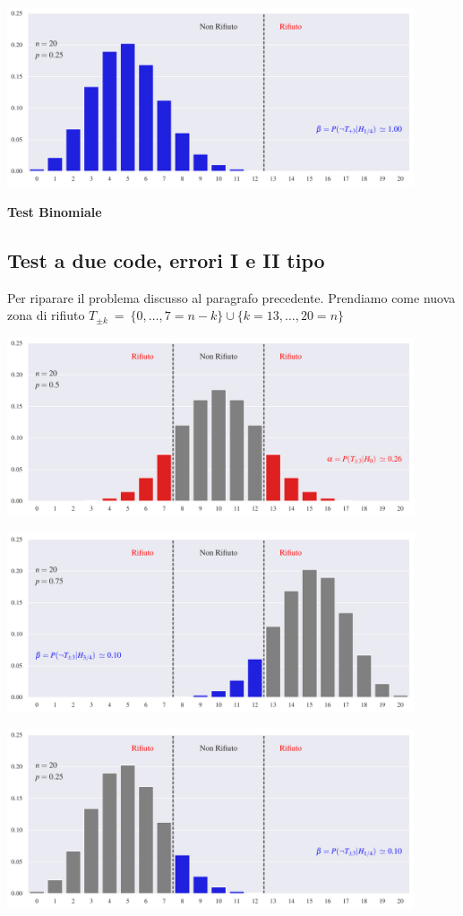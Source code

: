 \documentclass[11pt,openany]{book}
\begin{document}
\hfil\includegraphics[width=0.9\textwidth]{figure/B-test_03.pdf}


\clearpage\hfill\textbf{Test Binomiale}\subsection{Test a due code, errori I e II tipo}

Per riparare il problema discusso al paragrafo precedente. 
Prendiamo come nuova zona di rifiuto {\color{red}\boldmath $T_{\pm k}\ = \ \{0,\dots,7=n-k\}\cup \{k=13,\dots,20=n\}$}

\hfil\includegraphics[width=0.9\textwidth]{figure/B-test_04.pdf}

\hfil\includegraphics[width=0.9\textwidth]{figure/B-test_05.pdf}

\hfil\includegraphics[width=0.9\textwidth]{figure/B-test_06.pdf}
\end{document}
